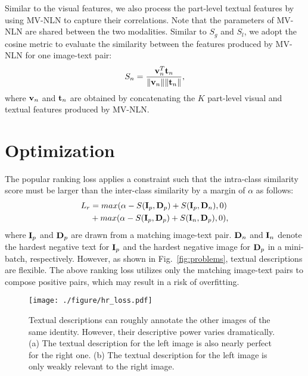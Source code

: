 \documentclass[journal]{IEEEtran}
\begin{document}
Similar to the visual features, we also process the part-level textual features by using MV-NLN to capture their correlations. Note that the  parameters of MV-NLN are shared between the two modalities. Similar to $S_{g}$ and $S_{l}$, we adopt the cosine metric to evaluate the similarity between the features produced by MV-NLN for one image-text pair:
\begin{equation}
S_{n}=\frac{{\bf{v}}_n^T {\bf{t}}_n}{\|{\bf{v}}_n\| \|{\bf{t}}_n\|},
\label{equ:cosine_similarity}
\end{equation}
where ${\bf{v}}_n$ and ${\bf{t}}_n$ are obtained by concatenating the $K$ part-level visual and textual features produced by MV-NLN.


\section{Optimization} \label{Optimization}
The popular ranking loss \cite{faghri2017vse++} applies a constraint such that the intra-class similarity score must be larger than the inter-class similarity by a margin of $\alpha$ as follows:
\begin{equation}
\begin{aligned}
{L}_{r} & = max(\alpha- {S}({\bf{I}}_{p}, {\bf{D}}_{p}) + {S}({\bf{I}}_{p}, {\bf{D}}_{n}), 0)\\
& + max(\alpha-{S}({\bf{I}}_{p}, {\bf{D}}_{p}) + {S}({\bf{I}}_{n}, {\bf{D}}_{p}), 0),
\end{aligned}
\end{equation}
where ${\bf{I}}_p$ and ${\bf{D}}_p$ are drawn from a matching image-text pair. ${\bf{D}}_n$ and ${\bf{I}}_n$ denote the hardest negative text for ${\bf{I}}_p$ and the hardest negative image for ${\bf{D}}_p$  in a mini-batch, respectively. However, as shown in Fig.~\ref{fig:problems}, textual descriptions are flexible. The above ranking loss utilizes only the matching image-text pairs to compose positive pairs, which may result in a risk of overfitting.

\begin{figure}[t]
\begin{center}
\texttt{[image: ./figure/hr\_loss.pdf]}
\end{center}
   \caption{Textual descriptions can roughly annotate the other images of the same identity. However, their descriptive power varies dramatically.  (a) The textual description for the left image is also nearly perfect for the right one. (b) The textual description for the left image is only weakly relevant to the right image. }
\label{fig:hr_loss}
\end{figure}
\end{document}
